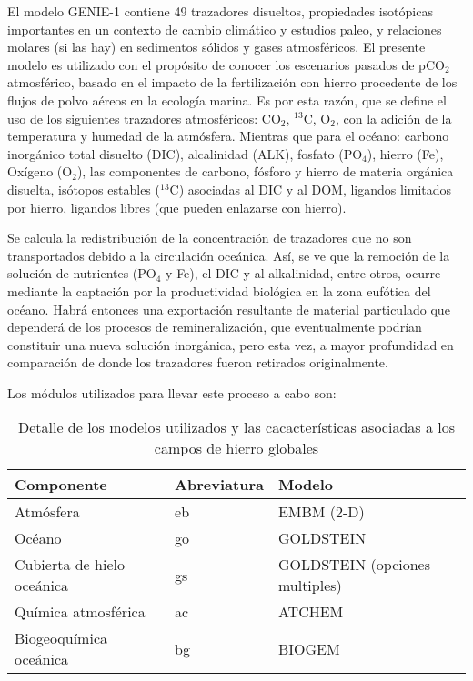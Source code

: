 El modelo GENIE-1 contiene 49 trazadores disueltos, propiedades isotópicas importantes en un contexto de cambio climático y estudios paleo, y relaciones molares (si las hay) en sedimentos sólidos y gases atmosféricos. El presente modelo es utilizado con el prop\'osito de conocer los escenarios pasados de pCO$_2$ atmosf\'erico, basado en el impacto de la fertilizaci\'on con hierro procedente de los flujos de polvo a\'ereos en la ecolog\'ia marina. Es por esta razón, que se define el uso de los siguientes trazadores atmosféricos: CO$_2$, $^{13}$C, O$_2$, con la adición de la temperatura y humedad de la atmósfera. Mientras que para el océano: carbono inorgánico total disuelto (DIC), alcalinidad (ALK), fosfato (PO$_4$), hierro (Fe), Oxígeno (O$_2$), las componentes de carbono, fósforo y hierro de materia orgánica disuelta, isótopos estables ($^{13}$C) asociadas al DIC y al DOM, ligandos limitados por hierro, ligandos libres (que pueden enlazarse con hierro). 

Se calcula la redistribución de la concentración de trazadores que no son transportados debido a la circulación oceánica. Así, se ve que la remoción de la solución de nutrientes (PO$_4$ y Fe), el DIC y al alkalinidad, entre otros, ocurre mediante la captación por la productividad biológica en la zona eufótica del océano. Habrá entonces una exportación resultante de material particulado que dependerá de los procesos de remineralización, que eventualmente podrían constituir una nueva solución inorgánica, pero esta vez, a mayor profundidad en comparación de donde los trazadores fueron retirados originalmente. 

Los módulos utilizados para llevar este proceso a cabo son: 

\begin{table}[H]
\centering
\begin{tabular}{|l|l|l|}
\hline
Componente& Abreviatura & Modelo \\
\hline \hline
Atmósfera & eb& EMBM (2-D) \\ \hline
Océano & go & GOLDSTEIN \\ \hline
Cubierta de hielo oceánica &gs& GOLDSTEIN (opciones multiples)  \\ \hline
Química atmosférica&ac&ATCHEM\\\hline
Biogeoquímica oceánica&bg&BIOGEM\\ \hline
\end{tabular}
\caption[Componentes modelo cGENIE]{Detalle de los modelos utilizados y las cacacter\'isticas asociadas a los campos de hierro globales}
\label{tabla:Met1}
\end{table}

